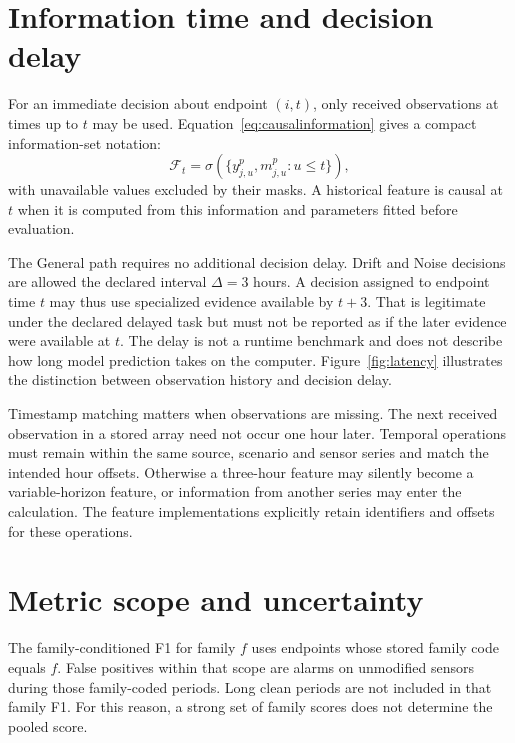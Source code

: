 \section{Information time and decision delay}
For an immediate decision about endpoint $(i,t)$, only received observations at times up to $t$ may be used. Equation~\eqref{eq:causalinformation} gives a compact information-set notation:
\begin{equation}
 \mathcal F_t=\sigma\!\left(\{y^p_{j,u},m^p_{j,u}:u\leq t\}\right),\label{eq:causalinformation}
\end{equation}
with unavailable values excluded by their masks. A historical feature is causal at $t$ when it is computed from this information and parameters fitted before evaluation.

The General path requires no additional decision delay. Drift and Noise decisions are allowed the declared interval $\Delta=3$ hours. A decision assigned to endpoint time $t$ may thus use specialized evidence available by $t+3$. That is legitimate under the declared delayed task but must not be reported as if the later evidence were available at $t$. The delay is not a runtime benchmark and does not describe how long model prediction takes on the computer. Figure~\ref{fig:latency} illustrates the distinction between observation history and decision delay.

Timestamp matching matters when observations are missing. The next received observation in a stored array need not occur one hour later. Temporal operations must remain within the same source, scenario and sensor series and match the intended hour offsets. Otherwise a three-hour feature may silently become a variable-horizon feature, or information from another series may enter the calculation. The feature implementations explicitly retain identifiers and offsets for these operations.


\section{Metric scope and uncertainty}
The family-conditioned F1 for family $f$ uses endpoints whose stored family code equals $f$. False positives within that scope are alarms on unmodified sensors during those family-coded periods. Long clean periods are not included in that family F1. For this reason, a strong set of family scores does not determine the pooled score.


